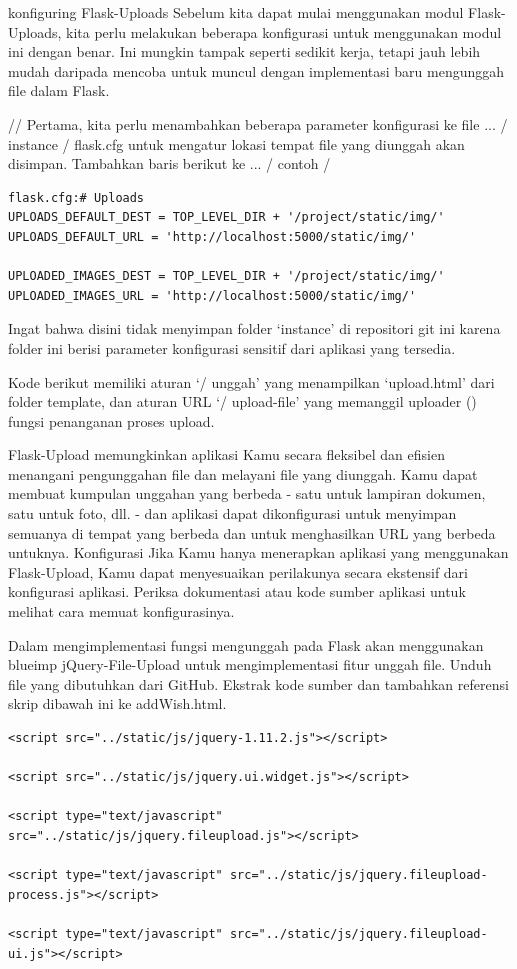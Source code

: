 konfiguring Flask-Uploads
Sebelum kita dapat mulai menggunakan modul Flask-Uploads, kita perlu melakukan beberapa konfigurasi untuk menggunakan modul ini dengan benar. Ini mungkin tampak seperti sedikit kerja, tetapi jauh lebih mudah daripada mencoba untuk muncul dengan implementasi baru mengunggah file dalam Flask.

// Pertama, kita perlu menambahkan beberapa parameter konfigurasi ke file ... / instance / flask.cfg untuk mengatur lokasi tempat file yang diunggah akan disimpan. Tambahkan baris berikut ke ... / contoh / 

\begin{verbatim}
flask.cfg:# Uploads
UPLOADS_DEFAULT_DEST = TOP_LEVEL_DIR + '/project/static/img/'
UPLOADS_DEFAULT_URL = 'http://localhost:5000/static/img/'
 
UPLOADED_IMAGES_DEST = TOP_LEVEL_DIR + '/project/static/img/'
UPLOADED_IMAGES_URL = 'http://localhost:5000/static/img/'
\end{verbatim}
Ingat bahwa disini tidak menyimpan folder ‘instance’ di repositori git ini karena folder ini berisi parameter konfigurasi sensitif dari aplikasi yang tersedia.

Kode berikut memiliki aturan ‘/ unggah’ yang menampilkan ‘upload.html’ dari folder template, dan aturan URL ‘/ upload-file’ yang memanggil uploader () fungsi penanganan proses upload.

Flask-Upload memungkinkan aplikasi Kamu secara fleksibel dan efisien menangani pengunggahan file dan melayani file yang diunggah. Kamu dapat membuat kumpulan unggahan yang berbeda - satu untuk lampiran dokumen, satu untuk foto, dll. - dan aplikasi dapat dikonfigurasi untuk menyimpan semuanya di tempat yang berbeda dan untuk menghasilkan URL yang berbeda untuknya.
Konfigurasi
Jika Kamu hanya menerapkan aplikasi yang menggunakan Flask-Upload, Kamu dapat menyesuaikan perilakunya secara ekstensif dari konfigurasi aplikasi. Periksa dokumentasi atau kode sumber aplikasi untuk melihat cara memuat konfigurasinya.


Dalam mengimplementasi fungsi mengunggah pada Flask akan menggunakan blueimp jQuery-File-Upload untuk mengimplementasi fitur unggah file. Unduh file yang dibutuhkan dari GitHub. Ekstrak kode sumber dan tambahkan referensi skrip dibawah ini ke addWish.html.
\begin{verbatim}
<script src="../static/js/jquery-1.11.2.js"></script>
 
<script src="../static/js/jquery.ui.widget.js"></script>
 
<script type="text/javascript" src="../static/js/jquery.fileupload.js"></script>
 
<script type="text/javascript" src="../static/js/jquery.fileupload-process.js"></script>
 
<script type="text/javascript" src="../static/js/jquery.fileupload-ui.js"></script>
\end{verbatim}

